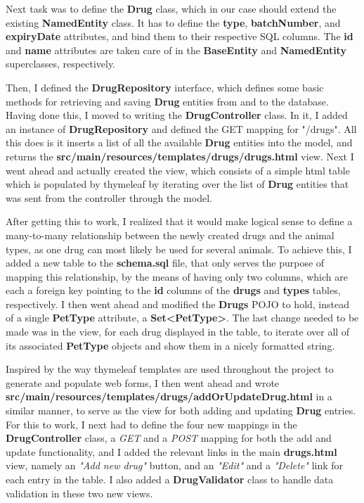 \documentclass[12pt, a4paper]{article}
\begin{document}
Next task was to define the \textbf{Drug} class, which in our case should extend the existing \textbf{NamedEntity} class. It has to define the \textbf{type}, \textbf{batchNumber}, and \textbf{expiryDate} attributes, and bind them to their respective SQL columns. The \textbf{id} and \textbf{name} attributes are taken care of in the \textbf{BaseEntity} and \textbf{NamedEntity} superclasses, respectively.

Then, I defined the \textbf{DrugRepository} interface, which defines some basic methods for retrieving and saving \textbf{Drug} entities from and to the database. Having done this, I moved to writing the \textbf{DrugController} class. In it, I added an instance of \textbf{DrugRepository} and defined the GET mapping for "/drugs". All this does is it inserts a list of all the available \textbf{Drug} entities into the model, and returns the \textbf{src/main/resources/templates/drugs/drugs.html} view. Next I went ahead and actually created the view, which consists of a simple html table which is populated by thymeleaf by iterating over the list of \textbf{Drug} entities that was sent from the controller through the model.

After getting this to work, I realized that it would make logical sense to define a many-to-many relationship between the newly created drugs and the animal types, as one drug can most likely be used for several animals. To achieve this, I added a new table to the \textbf{schema.sql} file, that only serves the purpose of mapping this relationship, by the means of having only two columns, which are each a foreign key pointing to the \textbf{id} columns of the \textbf{drugs} and \textbf{types} tables, respectively. I then went ahead and modified the \textbf{Drugs} POJO to hold, instead of a single \textbf{PetType} attribute, a \textbf{Set<PetType>}. The last change needed to be made was in the view, for each drug displayed in the table, to iterate over all of its associated \textbf{PetType} objects and show them in a nicely formatted string.

Inspired by the way thymeleaf templates are used throughout the project to generate and populate web forms, I then went ahead and wrote \textbf{src/main/resources/templates/drugs/addOrUpdateDrug.html} in a similar manner, to serve as the view for both adding and updating \textbf{Drug} entries. For this to work, I next had to define the four new mappings in the \textbf{DrugController} class, a \textit{GET} and a \textit{POST} mapping for both the add and update functionality, and I added the relevant links in the main \textbf{drugs.html} view, namely an \textit{"Add new drug"} button, and an \textit{"Edit"} and a \textit{"Delete"} link for each entry in the table. I also added a \textbf{DrugValidator} class to handle data validation in these two new views.
\end{document}
